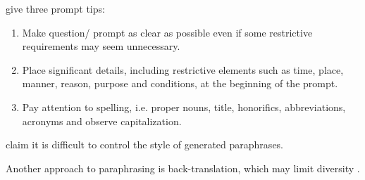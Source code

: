 \citet{fu_learning_2024} give three prompt tips:
\begin{enumerate}
    \item Make question/ prompt as clear as possible even if some restrictive requirements may seem unnecessary.
    \item Place significant details, including restrictive elements such as time, place, manner, reason, purpose and conditions, at the beginning of the prompt.
    \item Pay attention to spelling, i.e. proper nouns, title, honorifics, abbreviations, acronyms and observe capitalization.
\end{enumerate}

\citet{zhou_paraphrase_2021} claim it is difficult to control the style of generated paraphrases.

Another approach to paraphrasing is back-translation, which may limit diversity \citep{zhou_paraphrase_2025}.

